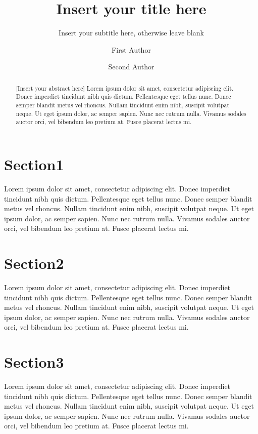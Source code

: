\documentclass[twocolumn]{svjour3}          %
\begin{document}
\title{Insert your title here}
\subtitle{Insert your subtitle here, otherwise leave blank}
\author{First Author \and Second Author}
\date{ }%

\maketitle

\begin{abstract}
[Insert your abstract here] Lorem ipsum dolor sit amet, consectetur adipiscing elit. Donec imperdiet tincidunt nibh quis dictum. Pellentesque eget tellus nunc. Donec semper blandit metus vel rhoncus. Nullam tincidunt enim nibh, suscipit volutpat neque. Ut eget ipsum dolor, ac semper sapien. Nunc nec rutrum nulla. Vivamus sodales auctor orci, vel bibendum leo pretium at. Fusce placerat lectus mi. 
\end{abstract}

\section{Section1}
\label{sec:1}
Lorem ipsum dolor sit amet, consectetur adipiscing elit. Donec imperdiet tincidunt nibh quis dictum. Pellentesque eget tellus nunc. Donec semper blandit metus vel rhoncus. Nullam tincidunt enim nibh, suscipit volutpat neque. Ut eget ipsum dolor, ac semper sapien. Nunc nec rutrum nulla. Vivamus sodales auctor orci, vel bibendum leo pretium at. Fusce placerat lectus mi.

\section{Section2}
\label{sec:2}
Lorem ipsum dolor sit amet, consectetur adipiscing elit. Donec imperdiet tincidunt nibh quis dictum. Pellentesque eget tellus nunc. Donec semper blandit metus vel rhoncus. Nullam tincidunt enim nibh, suscipit volutpat neque. Ut eget ipsum dolor, ac semper sapien. Nunc nec rutrum nulla. Vivamus sodales auctor orci, vel bibendum leo pretium at. Fusce placerat lectus mi.

\section{Section3}
\label{sec:3}
Lorem ipsum dolor sit amet, consectetur adipiscing elit. Donec imperdiet tincidunt nibh quis dictum. Pellentesque eget tellus nunc. Donec semper blandit metus vel rhoncus. Nullam tincidunt enim nibh, suscipit volutpat neque. Ut eget ipsum dolor, ac semper sapien. Nunc nec rutrum nulla. Vivamus sodales auctor orci, vel bibendum leo pretium at. Fusce placerat lectus mi.
\end{document}
